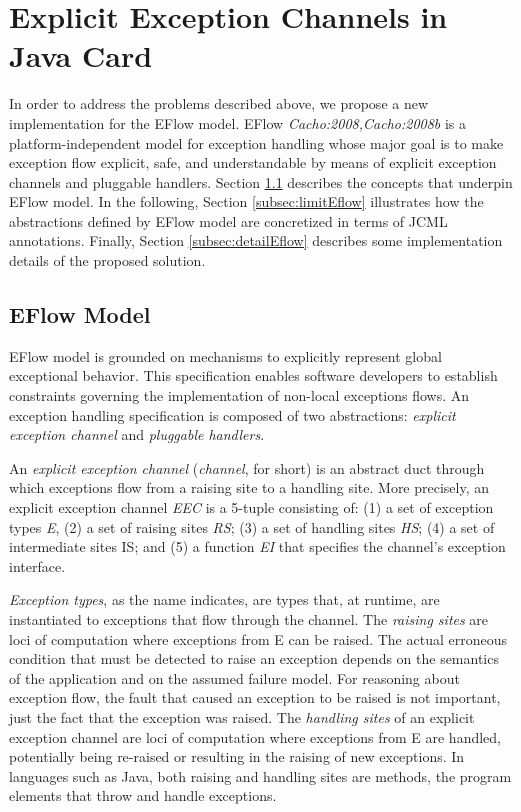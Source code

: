 \documentclass[10pt, conference, compsocconf]{IEEEtran}
\begin{document}
\section{Explicit Exception Channels in Java Card}
\label{sec:ChannelInJC}

In order to address the problems described above, we
propose a new implementation for the EFlow model.
EFlow \textit{Cacho:2008,Cacho:2008b} is a platform-independent model for
exception handling whose major goal is to make
exception flow explicit, safe, and understandable by
means of explicit exception channels and pluggable
handlers. Section \ref{subsec:eflow} describes the concepts that
underpin EFlow model. In the following, Section \ref{subsec:limitEflow}
illustrates how the abstractions defined by EFlow model are concretized in terms
of JCML annotations. Finally, Section \ref{subsec:detailEflow} describes some
implementation details of the proposed solution.

\subsection{EFlow Model}
\label{subsec:eflow}

EFlow model is grounded on mechanisms to explicitly
represent global exceptional behavior. This specification
enables software developers to establish constraints
governing the implementation of non-local exceptions
flows. An exception handling specification is composed
of two abstractions: \textit{explicit exception channel} and
\textit{pluggable handlers}.

An \textit{explicit exception channel} (\textit{channel}, for short) is
an abstract duct through which exceptions flow from a
raising site to a handling site. More precisely, an explicit
exception channel \textit{EEC} is a 5-tuple consisting of: (1) a set
of exception types \textit{E}, (2) a set of raising sites \textit{RS}; (3) a set
of handling sites \textit{HS}; (4) a set of intermediate sites IS; and
(5) a function \textit{EI} that specifies the channel's exception
interface.

\textit{Exception types}, as the name indicates, are types that,
at runtime, are instantiated to exceptions that flow through
the channel. The \textit{raising sites} are loci of computation
where exceptions from E can be raised. The actual
erroneous condition that must be detected to raise an
exception depends on the semantics of the application and
on the assumed failure model. For reasoning about
exception flow, the fault that caused an exception to be
raised is not important, just the fact that the exception was
raised. The \textit{handling sites} of an explicit exception channel
are loci of computation where exceptions from E are
handled, potentially being re-raised or resulting in the
raising of new exceptions. In languages such as Java, both
raising and handling sites are methods, the program
elements that throw and handle exceptions.
\end{document}
